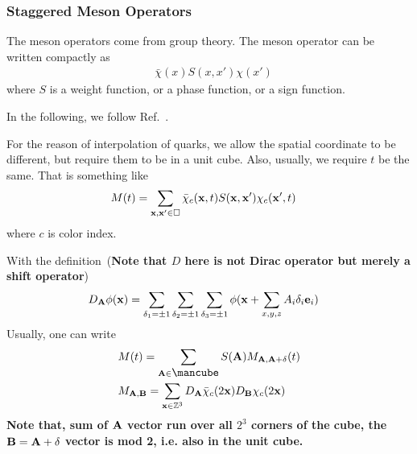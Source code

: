 \subsubsection{\label{StaggeredMesonOperators}Staggered Meson Operators}

The meson operators come from group theory. The meson operator can be written compactly as
\begin{equation}
\begin{split}
&\bar{\chi}(x) S(x,x')\chi (x')
\end{split}
\end{equation}
where $S$ is a weight function, or a phase function, or a sign function.

In the following, we follow Ref.~\cite{staggeredMeson}.

For the reason of interpolation of quarks, we allow the spatial coordinate to be different, but require them to be in a unit cube. Also, usually, we require $t$ be the same. That is something like
\begin{equation}
\begin{split}
&M(t)=\sum _{{\bf x},{\bf x}'\in \Box}\bar{\chi}_{c}({\bf x},t) S({\bf x},{\bf x}')\chi _c({\bf x}', t)
\end{split}
\end{equation}
where $c$ is color index.

With the definition~(\textcolor[rgb]{0,0,1}{\textbf{Note that $D$ here is not Dirac operator but merely a shift operator}})
\begin{equation}
\begin{split}
&D_{{\bf A}}\phi ({\bf x})=\sum _{\delta _1=\pm 1} \sum _{\delta _2=\pm 1}\sum _{\delta _3=\pm 1}\phi ({\bf x}+ \sum _{x,y,z}A_i\delta _i {\bf e}_i)
\end{split}
\end{equation}
Usually, one can write
\begin{equation}
\begin{split}
&M(t)=\sum _{{\bf A} \in \mbox{\mancube}}S({\bf A}) M_{{\bf A},{\bf A}+\delta}(t)\\
&M_{{\bf A},{\bf B}}=\sum _{{\bf x}\in \mathbb{Z}^3} D_{{\bf A}}\bar{\chi}_c(2{\bf x})D_{{\bf B}}\chi_c(2{\bf x})\\
\end{split}
\end{equation}
\textcolor[rgb]{0,0,1}{\textbf{Note that, sum of ${\bf A}$ vector run over all $2^3$ corners of the cube, the ${\bf B}={\bf A}+\delta $ vector is mod 2, i.e. also in the unit cube.}}

